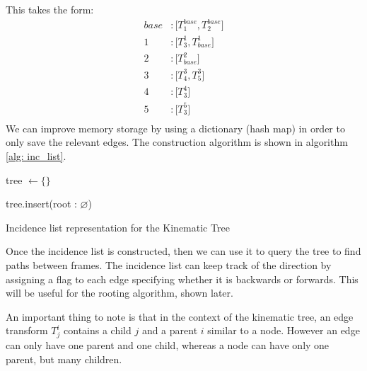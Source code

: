 This takes the form:
\begin{align}
	base &: \big[ T^{base}_1, T^{base}_2\big] \\
	1 &: \big[ T^1_3, T^1_{base} \big]\\
	2 &: \big[ T^2_{base}\big]\\
	3 &: \big[ T_4^3, T_5^3 \big] \\
	4 &: \big[ T_3^4\big] \\
	5 &: \big[ T_3^5\big] \\
\end{align}
We can improve memory storage by using a dictionary (hash map) in order to only save the relevant edges. 
The construction algorithm is shown in algorithm \ref{alg: inc_list}.

\begin{algorithm}
	\DontPrintSemicolon
	tree $\gets \{\}$

	tree.insert(root : $\varnothing$)


	\caption{Incidence list representation for the Kinematic Tree}
	\label{alg: inc_list}
\end{algorithm}

Once the incidence list is constructed, then we can use it to query the tree to find paths between frames.
The incidence list can keep track of the direction by assigning a flag to each edge specifying whether it is backwards or forwards. 
This will be useful for the rooting algorithm, shown later. 

An important thing to note is that in the context of the kinematic tree, an edge transform $T^i_j$ contains a child $j$ and a parent $i$ similar to a node. 
However an edge can only have one parent and one child, whereas a node can have only one parent, but many children. 

